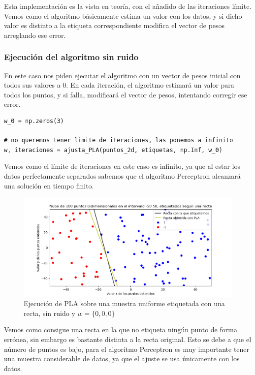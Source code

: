 \documentclass[12pt, spanish]{article}
\begin{document}
Esta implementación es la vista en teoría, con el añadido de las iteraciones límite. Vemos como el algoritmo básicamente estima un valor con los datos, y si dicho valor es distinto a la etiqueta correspondiente modifica el vector de pesos arreglando ese error.

\subsubsection{Ejecución del algoritmo sin ruido}

En este caso nos piden ejecutar el algoritmo con un vector de pesos inicial con todos sus valores a 0. En cada iteración, el algoritmo estimará un valor para todos los puntos, y si falla, modificará el vector de pesos, intentando corregir ese error.

\begin{lstlisting}
w_0 = np.zeros(3)

# no queremos tener limite de iteraciones, las ponemos a infinito
w, iteraciones = ajusta_PLA(puntos_2d, etiquetas, np.Inf, w_0)
\end{lstlisting}

Vemos como el límite de iteraciones en este caso es infinito, ya que al estar los datos perfectamente separados sabemos que el algoritmo Perceptron alcanzará una solución en tiempo finito.

\begin{figure}[H]
  \centering
      \includegraphics[scale = 0.70]{ej-2-PLA.png}
 		 \caption{Ejecución de PLA sobre una muestra uniforme etiquetada con una recta, sin ruido y $w = \{0, 0, 0\}$}
  		\label{fig:ej2-PLA}

\end{figure}

Vemos como consigue una recta en la que no etiqueta ningún punto de forma errónea, sin embargo es bastante distinta a la recta original. Esto se debe a que el número de puntos es bajo, para el algoritmo Perceptron es muy importante tener una muestra considerable de datos, ya que el ajuste se usa únicamente con los datos.
\end{document}
